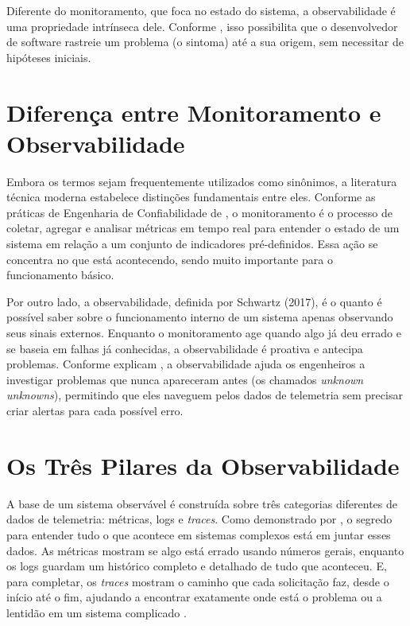 \documentclass[
    12pt
    ,oneside
    ,a4paper
    ,chapter=TITLE
    ,section=TITLE
    ,sumario=abnt-6027-2012]{abntex2}
\begin{document}
Diferente do monitoramento, que foca no estado do sistema, a observabilidade é uma propriedade intrínseca dele. Conforme , isso possibilita que o desenvolvedor de software rastreie um problema (o sintoma) até a sua origem, sem necessitar de hipóteses iniciais.

\section{Diferença entre Monitoramento e Observabilidade}

Embora os termos sejam frequentemente utilizados como sinônimos, a literatura técnica moderna estabelece distinções fundamentais entre eles. Conforme as práticas de Engenharia de Confiabilidade de , o monitoramento é o processo de coletar, agregar e analisar métricas em tempo real para entender o estado de um sistema em relação a um conjunto de indicadores pré-definidos. Essa ação se concentra no que está acontecendo, sendo muito importante para o funcionamento básico.

Por outro lado, a observabilidade, definida por Schwartz (2017), é o quanto é possível saber sobre o funcionamento interno de um sistema apenas observando seus sinais externos. Enquanto o monitoramento age quando algo já deu errado e se baseia em falhas já conhecidas, a observabilidade é proativa e antecipa problemas. Conforme explicam , a observabilidade ajuda os engenheiros a investigar problemas que nunca apareceram antes (os chamados \textit{unknown unknowns}), permitindo que eles naveguem pelos dados de telemetria sem precisar criar alertas para cada possível erro.

\section{Os Três Pilares da Observabilidade}

A base de um sistema observável é construída sobre três categorias diferentes de dados de telemetria: métricas, logs e \textit{traces}. Como demonstrado por , o segredo para entender tudo o que acontece em sistemas complexos está em juntar esses dados. As métricas mostram se algo está errado usando números gerais, enquanto os logs guardam um histórico completo e detalhado de tudo que aconteceu. E, para completar, os \textit{traces} mostram o caminho que cada solicitação faz, desde o início até o fim, ajudando a encontrar exatamente onde está o problema ou a lentidão em um sistema complicado \cite{majors2022observability}.
\end{document}
